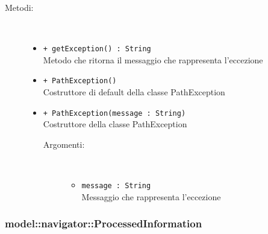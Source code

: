 \documentclass[../DefinizioneDiProdotto.tex]{subfiles}
\begin{document}
\begin{description}
\begin{itemize}
\end{itemize}
\item[Metodi:] \
\begin{itemize}
\item \texttt{+ getException() : String}\\
Metodo che ritorna il messaggio che rappresenta l'eccezione
 \item \texttt{+ PathException()}\\
Costruttore di default della classe PathException
 \item \texttt{+ PathException(message : String)}\\
Costruttore della classe PathException
 \begin{description}
\item[Argomenti:] \
\begin{itemize}
\item \texttt{message : String}\\
Messaggio che rappresenta l'eccezione\end{itemize}
\end{description}
\end{itemize}
\end{description}

\subsubsection{model::navigator::ProcessedInformation}
\end{document}

